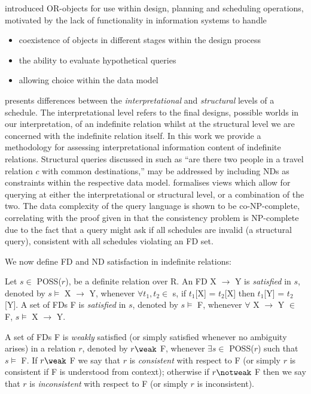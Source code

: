 \cite{inv91} introduced OR-objects for use within design, planning and
scheduling operations, motivated by the lack of functionality in
information systems to handle
\begin{itemize}
\item coexistence of objects in different stages within the design
process
\item the ability to evaluate hypothetical queries
\item allowing choice within the data model
\end{itemize}

\cite{inv91} presents differences between the {\em interpretational} and
{\em structural} levels of a schedule. The interpretational level refers to
the final designs, possible worlds in our interpretation, of an
indefinite relation whilst at the structural level we are concerned with
the indefinite relation itself. In this work we provide a methodology
for assessing interpretational information content of indefinite
relations. Structural queries discussed in
\cite{inv91,} such as ``are there two people in a travel relation $c$
with common destinations,'' may be addressed by including NDs as
constraints within the respective data model.  \cite{inv91} formalises
views which allow for querying at either the interpretational or
structural level, or a combination of the two. The data complexity of
the query language is shown to be co-NP-complete, correlating with the
proof given in \cite{vn95} that the consistency problem is NP-complete
due to the fact that a query might ask if all schedules are invalid (a
structural query), consistent with all schedules violating an FD set.

\medskip

We now define FD and ND satisfaction in indefinite relations:
\begin{definition}\label{def:sat-indef}
\begin{rm}
Let $s \in$ POSS($r$), be a definite relation over R.
An FD X $\to$ Y is {\em satisfied} in $s$,
denoted by $s \models$ X $\to$ Y, whenever
$\forall t_1, t_2 \in$ s, if $t_1$[X] = $t_2$[X] then $t_1$[Y] = $t_2$[Y].
A set of FDs F is {\em satisfied} in $s$,
denoted by $s \models$ F, whenever
$\forall$ X $\to$ Y $\in$ F, $s \models$ X $\to$ Y.

\smallskip
{}
A set of FDs F is {\em weakly} satisfied  
(or simply satisfied whenever no ambiguity arises) in a relation $r$,
denoted by $r \weak$ F, whenever 
$\exists s \in$ POSS($r$) such that $s \models$ F.
If $r \weak$ F we say that $r$ is {\em consistent} with respect to F 
(or simply $r$ is consistent if F is understood from context);
otherwise if $r \notweak$ F then we say that $r$ is {\em inconsistent}
with respect to F (or simply $r$ is inconsistent).
\end{rm}
\end{definition}


